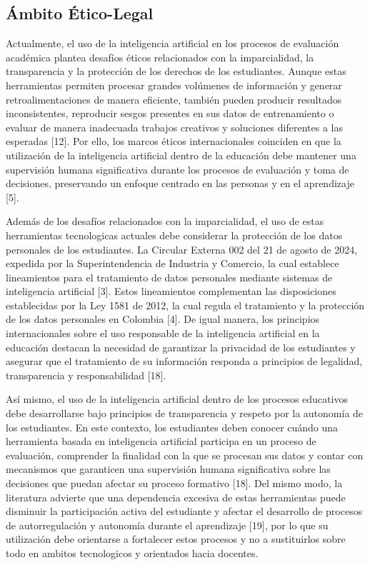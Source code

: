 \documentclass[letterpaper, 10 pt, conference]{ieeeconf}  %
\begin{document}
    \subsection{Ámbito Ético-Legal} 
    Actualmente, el uso de la inteligencia artificial en los procesos de evaluación académica plantea desafíos éticos relacionados con la imparcialidad, la transparencia y la protección de los derechos de los estudiantes. Aunque estas herramientas permiten procesar grandes volúmenes de información y generar retroalimentaciones de manera eficiente, también pueden producir resultados inconsistentes, reproducir sesgos presentes en sus datos de entrenamiento o evaluar de manera inadecuada trabajos creativos y soluciones diferentes a las esperadas [12]. Por ello, los marcos éticos internacionales coinciden en que la utilización de la inteligencia artificial dentro de la educación debe mantener una supervisión humana significativa durante los procesos de evaluación y toma de decisiones, preservando un enfoque centrado en las personas y en el aprendizaje [5].

    Además de los desafíos relacionados con la imparcialidad, el uso de estas herramientas tecnologicas actuales debe considerar la protección de los datos personales de los estudiantes. La Circular Externa 002 del 21 de agosto de 2024, expedida por la Superintendencia de Industria y Comercio, la cual establece lineamientos para el tratamiento de datos personales mediante sistemas de inteligencia artificial [3]. Estos lineamientos complementan las disposiciones establecidas por la Ley 1581 de 2012, la cual regula el tratamiento y la protección de los datos personales en Colombia [4]. De igual manera, los principios internacionales sobre el uso responsable de la inteligencia artificial en la educación destacan la necesidad de garantizar la privacidad de los estudiantes y asegurar que el tratamiento de su información responda a principios de legalidad, transparencia y responsabilidad [18].

    Así mismo, el uso de la inteligencia artificial dentro de los procesos educativos debe desarrollarse bajo principios de transparencia y respeto por la autonomía de los estudiantes. En este contexto, los estudiantes deben conocer cuándo una herramienta basada en inteligencia artificial participa en un proceso de evaluación, comprender la finalidad con la que se procesan sus datos y contar con mecanismos que garanticen una supervisión humana significativa sobre las decisiones que puedan afectar su proceso formativo [18]. Del mismo modo, la literatura advierte que una dependencia excesiva de estas herramientas puede disminuir la participación activa del estudiante y afectar el desarrollo de procesos de autorregulación y autonomía durante el aprendizaje [19], por lo que su utilización debe orientarse a fortalecer estos procesos y no a sustituirlos sobre todo en ambitos tecnologicos y orientados hacia docentes.
\end{document}

